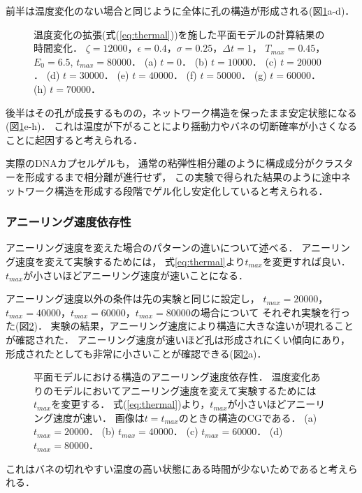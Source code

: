 前半は温度変化のない場合と同じように全体に孔の構造が形成される(図\ref{fig:result_2d_with_anearing}a-d)．
\begin{figure}
    \centering
    
    \caption{
        温度変化の拡張(式(\ref{eq:thermal}))を施した平面モデルの計算結果の時間変化．
        $\zeta=12000$，$\epsilon=0.4$，$\sigma=0.25$，$\Delta t=1$，
        $T_{max}=0.45$，$E_0=6.5$, $t_{max}=80000$．
        (a) $t=0$．
        (b) $t=10000$．
        (c) $t=20000$．
        (d) $t=30000$．
        (e) $t=40000$．
        (f) $t=50000$．
        (g) $t=60000$．
        (h) $t=70000$．
    }
    \label{fig:result_2d_with_anearing}
\end{figure}
後半はその孔が成長するものの，ネットワーク構造を保ったまま安定状態になる(図\ref{fig:result_2d_with_anearing}e-h)．
これは温度が下がることにより揺動力やバネの切断確率が小さくなることに起因すると考えられる．

実際のDNAカプセルゲルも，
通常の粘弾性相分離のように構成成分がクラスターを形成するまで相分離が進行せず，
この実験で得られた結果のように途中ネットワーク構造を形成する段階でゲル化し安定化していると考えられる．


\subsubsection{アニーリング速度依存性}
アニーリング速度を変えた場合のパターンの違いについて述べる．
アニーリング速度を変えて実験するためには，
式\ref{eq:thermal}より$t_{max}$を変更すれば良い．
$t_{max}$が小さいほどアニーリング速度が速いことになる．

アニーリング速度以外の条件は先の実験と同じに設定し，
$t_{max}=20000$，$t_{max}=40000$，$t_{max}=60000$，$t_{max}=80000$の場合について
それぞれ実験を行った(図\ref{fig:result_2d_anearing_speed})．
実験の結果，アニーリング速度により構造に大きな違いが現れることが確認された．
アニーリング速度が速いほど孔は形成されにくい傾向にあり，
形成されたとしても非常に小さいことが確認できる(図\ref{fig:result_2d_anearing_speed}a)．
\begin{figure}
    \centering
    
    \caption{
        平面モデルにおける構造のアニーリング速度依存性．
        温度変化ありのモデルにおいてアニーリング速度を変えて実験するためには$t_{max}$を変更する．
        式(\ref{eq:thermal})より，$t_{max}$が小さいほどアニーリング速度が速い．
        画像は$t=t_{max}$のときの構造のCGである．
        (a) $t_{max}=20000$．
        (b) $t_{max}=40000$．
        (c) $t_{max}=60000$．
        (d) $t_{max}=80000$．
    }
    \label{fig:result_2d_anearing_speed}
\end{figure}
これはバネの切れやすい温度の高い状態にある時間が少ないためであると考えられる．

